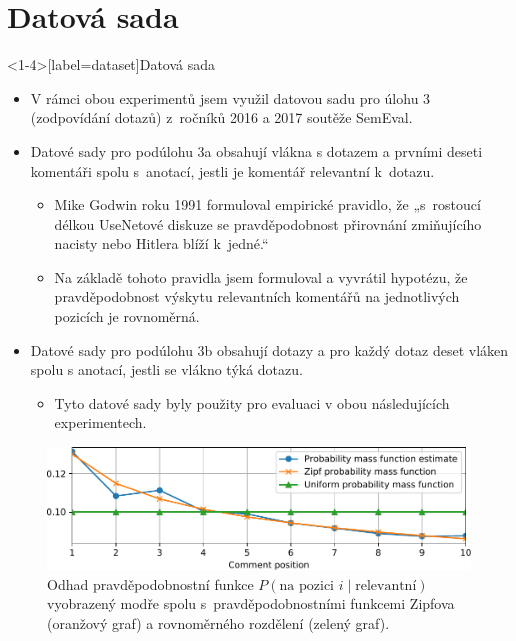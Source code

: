 \documentclass[aspectratio=169,t]{beamer}
\begin{document}
\section{Datová sada}
\begin{frame}<1-4>[label=dataset]{Datová sada}
\begin{itemize}
\item<1-> V rámci obou experimentů jsem využil datovou sadu pro úlohu 3
  (zodpovídání dotazů) z~ročníků 2016 a 2017 soutěže SemEval.
\item<2-> Datové sady pro podúlohu 3a obsahují \alert<2-6>{vlákna s dotazem a
  prvními deseti komentáři} spolu s~anotací, jestli \alert<2-6>{je komentář
  relevantní k~dotazu}.
  \begin{itemize}
    \item<3-> Mike Godwin roku 1991 formuloval empirické pravidlo, že
      „s~rostoucí délkou UseNetové diskuze se pravděpodobnost přirovnání
      zmiňujícího nacisty nebo Hitlera blíží k~jedné.“
    \item<4-> Na základě tohoto pravidla jsem formuloval a vyvrátil hypotézu, že
      \alert<4>{pravděpodobnost výskytu relevantních komentářů na jednotlivých
      pozicích je rovnoměrná}.
  \end{itemize}
\item<5-> Datové sady pro podúlohu 3b obsahují dotazy a \alert<5-6>{pro každý
  dotaz deset vláken} spolu s anotací, jestli se \alert<5-6>{vlákno týká dotazu}.
  \begin{itemize}
    \item<6-> Tyto datové sady byly použity pro evaluaci v obou následujících
      experimentech.
  \end{itemize}
\end{itemize}
\end{frame}

\begin{frame}[c]
\begin{figure}
\vfill
\begin{center}
\includegraphics[scale=0.8]{figs/quality-evaluation-1.pdf}
\caption{Odhad pravděpodobnostní funkce $P(\text{na pozici }i\mid\text{relevantní})$
  vyobrazený modře spolu s~pravděpodobnostními funkcemi Zipfova (oranžový graf)
  a rovnoměrného rozdělení (zelený graf).}
\end{center}
\end{figure}
\end{frame}
\end{document}
